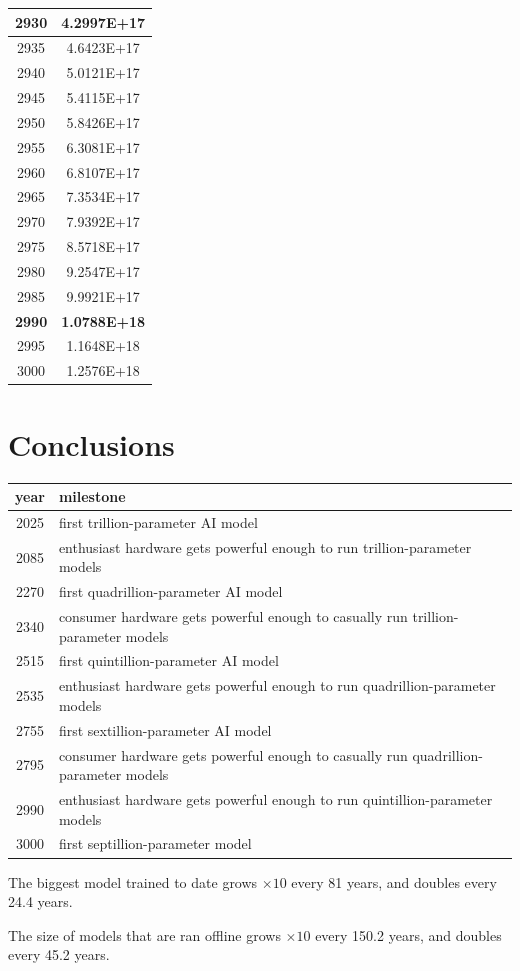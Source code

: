 \documentclass[a4paper]{article}
\begin{document}
\begin{tabular}{| c | c |}
    	2930 & 4.2997E+17 \\\hline
    	2935 & 4.6423E+17 \\\hline
    	2940 & 5.0121E+17 \\\hline
    	2945 & 5.4115E+17 \\\hline
    	2950 & 5.8426E+17 \\\hline
    	2955 & 6.3081E+17 \\\hline
    	2960 & 6.8107E+17 \\\hline
    	2965 & 7.3534E+17 \\\hline
    	2970 & 7.9392E+17 \\\hline
    	2975 & 8.5718E+17 \\\hline
    	2980 & 9.2547E+17 \\\hline
    	2985 & 9.9921E+17 \\\hline
    	\textbf{2990} & \textbf{1.0788E+18} \\\hline
    	2995 & 1.1648E+18 \\\hline
    	3000 & 1.2576E+18 \\\hline
    \end{tabular}
    
    \normalsize
    
    \pagebreak
    
    \section{Conclusions}
    
    \begin{tabular}{c | l}
    	year & milestone \\\hline
    	2025 & first trillion-parameter AI model \\\hline
    	2085 & enthusiast hardware gets powerful enough to run trillion-parameter models \\\hline
    	2270 & first quadrillion-parameter AI model \\\hline
    	2340 & consumer hardware gets powerful enough to casually run trillion-parameter models \\\hline
    	2515 & first quintillion-parameter AI model \\\hline
    	2535 & enthusiast hardware gets powerful enough to run quadrillion-parameter models \\\hline
    	2755 & first sextillion-parameter AI model \\\hline
    	2795 & consumer hardware gets powerful enough to casually run quadrillion-parameter models \\\hline
    	2990 & enthusiast hardware gets powerful enough to run quintillion-parameter models \\\hline
    	3000 & first septillion-parameter model
    \end{tabular}
    
    \medskip
    
    \noindent The biggest model trained to date grows $\times 10$ every 81 years, and doubles every 24.4 years.
    
    \medskip
    
    \noindent The size of models that are ran offline grows $\times 10$ every 150.2 years, and doubles every 45.2 years.
	
\end{document}
